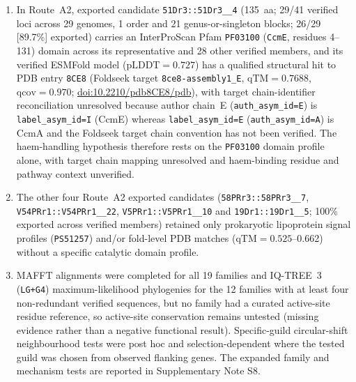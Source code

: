 \begin{enumerate}
\item In Route~A2, exported candidate \texttt{51Dr3::\allowbreak 51Dr3\_\_4} (135~aa; 29/41 verified loci across 29 genomes, 1 order and 21 genus-or-singleton blocks; 26/29 [89.7\%] exported) carries an InterProScan Pfam \texttt{PF03100} (\texttt{CcmE}, residues 4--131) domain across its representative and 28 other verified members, and its verified ESMFold model ($\mathrm{pLDDT}=0.727$) has a qualified structural hit to PDB entry \texttt{8CE8} (Foldseek target \texttt{8ce8-assembly1\_E}, $\mathrm{qTM}=0.7688$, $\mathrm{qcov}=0.970$; \href{https://doi.org/10.2210/pdb8CE8/pdb}{doi:10.2210/pdb8CE8/pdb}), with target chain-identifier reconciliation unresolved because author chain~E (\texttt{auth\_asym\_id=E}) is \texttt{label\_asym\_id=I} (CcmE) whereas \texttt{label\_asym\_id=E} (\texttt{auth\_asym\_id=A}) is CcmA and the Foldseek target chain convention has not been verified. The haem-handling hypothesis therefore rests on the \texttt{PF03100} domain profile alone, with target chain mapping unresolved and haem-binding residue and pathway context unverified.
\item The other four Route~A2 exported candidates (\texttt{58PRr3::\allowbreak 58PRr3\_\_7}, \texttt{V54PRr1::\allowbreak V54PRr1\_\_22}, \texttt{V5PRr1::\allowbreak V5PRr1\_\_10} and \texttt{19Dr1::\allowbreak 19Dr1\_\_5}; 100\% exported across verified members) retained only prokaryotic lipoprotein signal profiles (\texttt{PS51257}) and/or fold-level PDB matches ($\mathrm{qTM}=0.525$--0.662) without a specific catalytic domain profile.
\item MAFFT alignments were completed for all 19 families and IQ-TREE~3 (\texttt{LG+G4}) maximum-likelihood phylogenies for the 12 families with at least four non-redundant verified sequences, but no family had a curated active-site residue reference, so active-site conservation remains untested (missing evidence rather than a negative functional result). Specific-guild circular-shift neighbourhood tests were post hoc and selection-dependent where the tested guild was chosen from observed flanking genes. The expanded family and mechanism tests are reported in Supplementary Note S8.
\end{enumerate}

